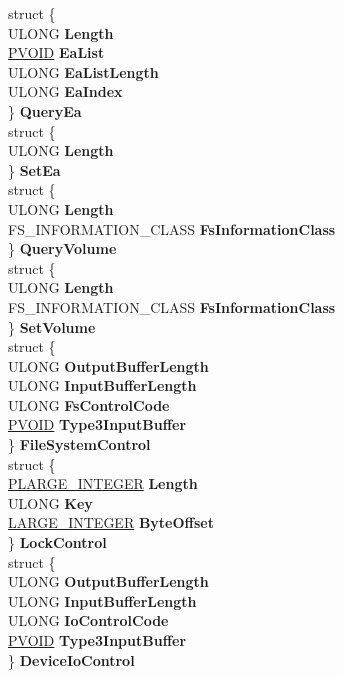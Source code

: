 \begin{DoxyCompactItemize}
\begin{tabbing}
\>struct \{\\
\>\>ULONG {\bfseries Length}\\
\>\>\hyperlink{interfacevoid}{PVOID} {\bfseries EaList}\\
\>\>ULONG {\bfseries EaListLength}\\
\>\>ULONG {\bfseries EaIndex}\\
\>\} {\bfseries QueryEa}\\
\>struct \{\\
\>\>ULONG {\bfseries Length}\\
\>\} {\bfseries SetEa}\\
\>struct \{\\
\>\>ULONG {\bfseries Length}\\
\>\>FS\_INFORMATION\_CLASS {\bfseries FsInformationClass}\\
\>\} {\bfseries QueryVolume}\\
\>struct \{\\
\>\>ULONG {\bfseries Length}\\
\>\>FS\_INFORMATION\_CLASS {\bfseries FsInformationClass}\\
\>\} {\bfseries SetVolume}\\
\>struct \{\\
\>\>ULONG {\bfseries OutputBufferLength}\\
\>\>ULONG {\bfseries InputBufferLength}\\
\>\>ULONG {\bfseries FsControlCode}\\
\>\>\hyperlink{interfacevoid}{PVOID} {\bfseries Type3InputBuffer}\\
\>\} {\bfseries FileSystemControl}\\
\>struct \{\\
\>\>\hyperlink{union___l_a_r_g_e___i_n_t_e_g_e_r}{PLARGE\_INTEGER} {\bfseries Length}\\
\>\>ULONG {\bfseries Key}\\
\>\>\hyperlink{union___l_a_r_g_e___i_n_t_e_g_e_r}{LARGE\_INTEGER} {\bfseries ByteOffset}\\
\>\} {\bfseries LockControl}\\
\>struct \{\\
\>\>ULONG {\bfseries OutputBufferLength}\\
\>\>ULONG {\bfseries InputBufferLength}\\
\>\>ULONG {\bfseries IoControlCode}\\
\>\>\hyperlink{interfacevoid}{PVOID} {\bfseries Type3InputBuffer}\\
\>\} {\bfseries DeviceIoControl}\\

\end{tabbing}
\end{DoxyCompactItemize}

